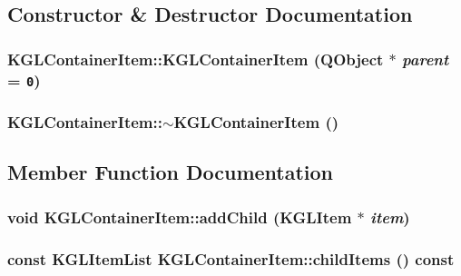 \subsection{Constructor \& Destructor Documentation}
\hypertarget{class_k_g_l_container_item_528a22298dba0b7d924d815021974f21}{
\subsubsection[{KGLContainerItem}]{\setlength{\rightskip}{0pt plus 5cm}KGLContainerItem::KGLContainerItem (QObject $\ast$ {\em parent} = {\tt 0})}}
\label{class_k_g_l_container_item_528a22298dba0b7d924d815021974f21}


\hypertarget{class_k_g_l_container_item_3423869f556bf2b5949fe49c91e6d2f0}{
\subsubsection[{$\sim$KGLContainerItem}]{\setlength{\rightskip}{0pt plus 5cm}KGLContainerItem::$\sim$KGLContainerItem ()}}
\label{class_k_g_l_container_item_3423869f556bf2b5949fe49c91e6d2f0}




\subsection{Member Function Documentation}
\hypertarget{class_k_g_l_container_item_1fb6362381fbdd8270b02d66d5b02181}{
\subsubsection[{addChild}]{\setlength{\rightskip}{0pt plus 5cm}void KGLContainerItem::addChild ({\bf KGLItem} $\ast$ {\em item})}}
\label{class_k_g_l_container_item_1fb6362381fbdd8270b02d66d5b02181}


\hypertarget{class_k_g_l_container_item_3ade56aba64c289d67dfb1762c161182}{
\subsubsection[{childItems}]{\setlength{\rightskip}{0pt plus 5cm}const {\bf KGLItemList} KGLContainerItem::childItems () const}}
\label{class_k_g_l_container_item_3ade56aba64c289d67dfb1762c161182}


